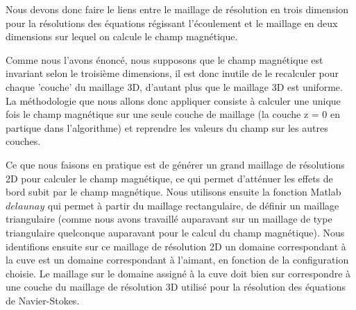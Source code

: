 \documentclass[a4paper,12pt,titlepage]{report}
\begin{document}
\begin{onehalfspace}
Nous devons donc faire le liens entre le maillage de résolution en trois dimension pour la résolutions des équations régissant l'écoulement et le maillage en deux dimensions sur lequel on calcule le champ magnétique. 

Comme nous l'avons énoncé, nous supposons que le champ magnétique est invariant selon le troisième dimensions, il est donc inutile de le recalculer pour chaque 'couche' du maillage 3D, d'autant plus que le maillage 3D est uniforme. 
La méthodologie que nous allons donc appliquer consiste à calculer une unique fois le champ magnétique sur une seule couche de maillage (la couche z = 0 en partique dans l'algorithme) et reprendre les valeurs du champ sur les autres couches.

Ce que nous faisons en pratique est de générer un grand maillage de résolutions 2D pour calculer le champ magnétique, ce qui permet d'atténuer les effets de bord subit par le champ magnétique. 
\newline
Nous utilisons ensuite la fonction Matlab $delaunay$ qui permet à partir du maillage rectangulaire, de définir un maillage triangulaire (comme nous avons travaillé auparavant sur un maillage de type triangulaire quelconque auparavant pour le calcul du champ magnétique).
Nous identifions ensuite sur ce maillage de résolution 2D un domaine correspondant à la cuve est un domaine correspondant à l'aimant, en fonction de la configuration choisie. Le maillage sur le domaine assigné à la cuve doit bien sur correspondre à une couche du maillage de résolution 3D utilisé pour la résolution des équations de Navier-Stokes.


\end{onehalfspace}
\end{document}
